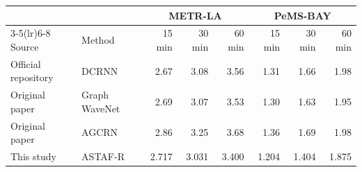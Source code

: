 \begin{tabular}{llrrrrrr}
\toprule
& & \multicolumn{3}{c}{METR-LA} & \multicolumn{3}{c}{PeMS-BAY}\\
\cmidrule(lr){3-5}\cmidrule(lr){6-8}
Source & Method & 15 min & 30 min & 60 min & 15 min & 30 min & 60 min\\
\midrule
Official repository & DCRNN & 2.67 & 3.08 & 3.56 & 1.31 & 1.66 & 1.98\\
Original paper & Graph WaveNet & 2.69 & 3.07 & 3.53 & 1.30 & 1.63 & 1.95\\
Original paper & AGCRN & 2.86 & 3.25 & 3.68 & 1.36 & 1.69 & 1.98\\
This study & ASTAF-R & 2.717 & 3.031 & 3.400 & 1.204 & 1.404 & 1.875\\
\bottomrule
\end{tabular}

